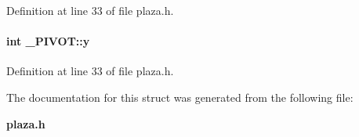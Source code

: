 Definition at line 33 of file plaza.h.\label{_PIVOT_m1}
\paragraph{\setlength{\rightskip}{0pt plus 5cm}int \_\-PIVOT::y}\hfill



Definition at line 33 of file plaza.h.

The documentation for this struct was generated from the following file:\begin{CompactItemize}
\item 
{\bf plaza.h}\end{CompactItemize}
